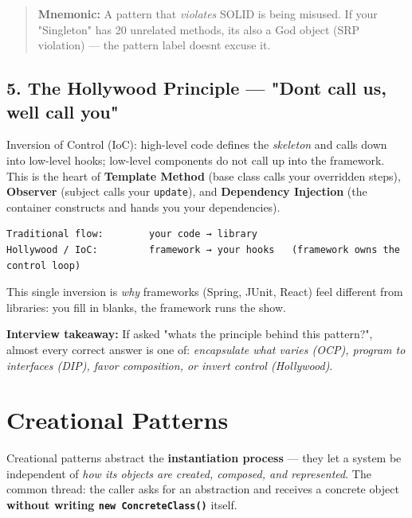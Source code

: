 \documentclass[11pt]{article}
\begin{document}
\begin{quote}
\textbf{Mnemonic:} A pattern that \emph{violates} SOLID is being misused. If your "Singleton" has 20 unrelated methods, it\textquotesingle s also a God object (SRP violation) --- the pattern label doesn\textquotesingle t excuse it.
\end{quote}

\subsection{5. The Hollywood Principle --- "Don\textquotesingle t call us, we\textquotesingle ll call you"}\label{5-the-hollywood-principle--dont-call-us-well-call-you}

Inversion of Control (IoC): high-level code defines the \emph{skeleton} and calls down into low-level hooks; low-level components do not call up into the framework. This is the heart of \textbf{Template Method} (base class calls your overridden steps), \textbf{Observer} (subject calls your \texttt{update}), and \textbf{Dependency Injection} (the container constructs and hands you your dependencies).

\setcodelang{}

\begin{verbatim}
Traditional flow:        your code → library
Hollywood / IoC:         framework → your hooks   (framework owns the control loop)
\end{verbatim}

This single inversion is \emph{why} frameworks (Spring, JUnit, React) feel different from libraries: you fill in blanks, the framework runs the show.

\textbf{Interview takeaway:} If asked "what\textquotesingle s the principle behind this pattern?", almost every correct answer is one of: \emph{encapsulate what varies (OCP), program to interfaces (DIP), favor composition, or invert control (Hollywood)}.

\section{Creational Patterns}\label{creational-patterns}

Creational patterns abstract the \textbf{instantiation process} --- they let a system be independent of \emph{how its objects are created, composed, and represented}. The common thread: the caller asks for an abstraction and receives a concrete object \textbf{without writing \texttt{new\ ConcreteClass()}} itself.
\end{document}
